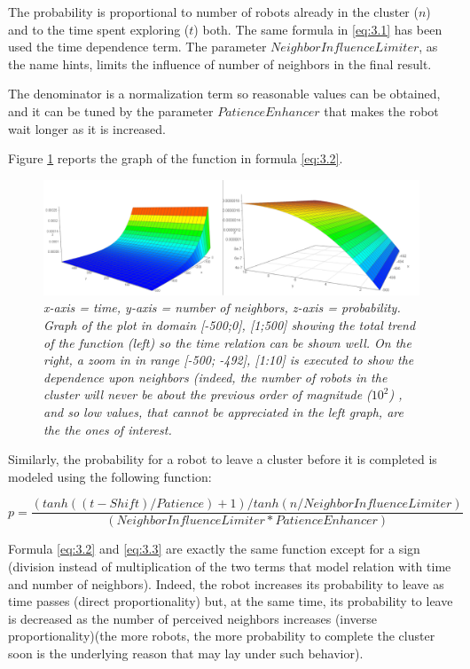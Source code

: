 The probability is proportional to number of robots already in the cluster ($n$) and to the time spent exploring ($t$) both. The same formula in \ref{eq:3.1} has been used the time dependence term. 
The parameter $NeighborInfluenceLimiter$, as the name hints, limits the influence of number of neighbors in the final result.

\noindent
The denominator is a normalization term so reasonable values can be obtained, and it can be tuned by the parameter $PatienceEnhancer$ that makes the robot wait longer as it is increased.

\noindent
Figure \ref{fig:cluster-join} reports the graph of the function in formula \ref{eq:3.2}.

\begin{figure}[H]
\centering
\includegraphics[width=\linewidth]{images/cluster_join.png}
\caption{\textit{x-axis = time, y-axis = number of neighbors, z-axis = probability. Graph of the plot in domain [-500;0], [1;500]  showing the total trend of the function (left) so the time relation can be shown well. On the right, a zoom in in range [-500; -492], [1:10] is executed to show the dependence upon neighbors (indeed, the number of robots in the cluster will never be about the previous order of magnitude ($10^2$) , and so low values, that cannot be appreciated in the left graph, are the the ones of interest.}}
\label{fig:cluster-join}
\end{figure}

Similarly, the probability for a robot to leave a cluster before it is completed is modeled using the following function:

\begin{equation}
    p =  \frac{(tanh((t - Shift) / Patience) + 1) / tanh(n / NeighborInfluenceLimiter)}{(NeighborInfluenceLimiter * PatienceEnhancer)} \tag{3.3}\label{eq:3.3}
\end{equation}

Formula \ref{eq:3.2} and \ref{eq:3.3} are exactly the same function except for a sign (division instead of multiplication of the two terms that model relation with time and number of neighbors). Indeed, the robot increases its probability to leave as time passes (direct proportionality) but, at the same time, its probability to leave is decreased as the number of perceived neighbors increases (inverse proportionality)(the more robots, the more probability to complete the cluster soon is the underlying reason that may lay under such behavior). 

